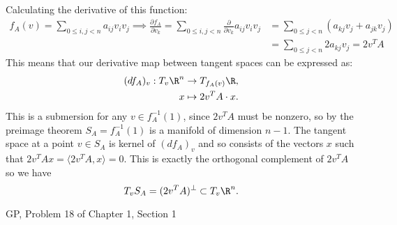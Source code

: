 \documentclass[11pt,letterpaper]{article}
\begin{document}
\begin{solution}
    \quad Calculating the derivative of this function:
    \[
        \begin{aligned}
            f_A(v) = \sum_{0\leq i,j<n} a_{ij} v_i v_j \implies \frac{\partial f_A}{\partial v_k} = \sum_{0\leq i,j<n} \frac{\partial}{\partial v_k} a_{ij} v_i v_j& = \sum_{0\leq j < n} (a_{kj} v_j + a_{jk} v_j)\\
            &=\sum_{0\leq j < n} 2a_{kj} v_j = 2v^TA
        \end{aligned}
    \]
    This means that our derivative map between tangent spaces can be expressed as:
    \[
        \begin{aligned}
            (df_A)_v : T_v \R^n &\to T_{f_A(v)} \R, \\
            x &\mapsto 2v^TA \cdot x.
        \end{aligned}
    \]  
    This is a submersion for any $v\in f^{-1}_A(1)$, since $2v^TA$ must be nonzero, so by the preimage theorem $S_A=f^{-1}_A(1)$ is a manifold of dimension $n-1$. The tangent space at a point $v\in S_A$ is kernel of $(df_A)_v$ and so consists of the vectors $x$ such that $2v^TAx=\big\langle 
    2v^TA, x\big\rangle = 0$. This is exactly the orthogonal complement of $2v^TA$ so we have
    \[
        T_v S_A = (2v^TA)^\perp \subset T_v\R^n
    .\]  
\end{solution}

\begin{problem}
    GP, Problem 18 of Chapter 1, Section 1
\end{problem}
\end{document}
